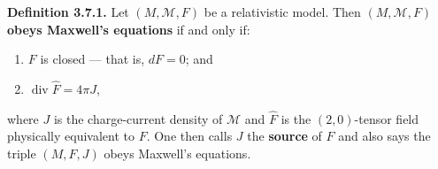 \textbf{Definition 3.7.1.} Let $(M, \mathcal{M}, F)$ be a relativistic model. Then $(M, \mathcal{M}, F)$ \textbf{obeys Maxwell's equations} if and only if:

\begin{enumerate}
\item[(a)] $F$ is closed --- that is, $dF = 0$; and
\item[(b)] $\operatorname{div} \hat{F} = 4\pi J$,
\end{enumerate}

where $J$ is the charge-current density of $\mathcal{M}$ and $\hat{F}$ is the $(2,0)$-tensor field physically equivalent to $F$. One then calls $J$ the \textbf{source} of $F$ and also says the triple $(M, F, J)$ obeys Maxwell's equations.
